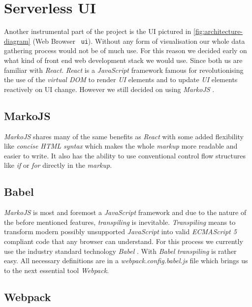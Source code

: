 \section{Serverless UI}

Another instrumental part of the project is the UI pictured in \autoref{fig:architecture-diagram}
(Web Browser \textrightarrow\ \texttt{ui}). Without any form of visualisation our whole data
gathering process would not be of much use. For this reason we decided early on what kind of front
end web development stack we would use. Since both us are familiar with \textit{React}.
\textit{React} is a \textit{JavaScript} framework famous for revolutionising the use of the
\textit{virtual DOM} to render \textit{UI} elements and to update \textit{UI} elements reactively on
UI change. However we still decided on using \textit{MarkoJS} \cite{marko}.

\subsection{MarkoJS}

\textit{MarkoJS} shares many of the same benefits as \textit{React} with some added flexibility like
\textit{concise HTML syntax} which makes the whole \textit{markup} more readable and easier to
write. It also has the ability to use conventional control flow structures like \textit{if} or
\textit{for} directly in the \textit{markup}.

\subsection{Babel}

\textit{MarkoJS} is most and foremost a \textit{JavaScript} framework and due to the nature of the
before mentioned features, \textit{transpiling} is inevitable. \textit{Transpiling} means to
transform modern possibly unsupported \textit{JavaScript} into valid \textit{ECMAScript 5} compliant
code that any browser can understand. For this process we currently use the industry standard
technology \textit{Babel} \cite{babel}. With \textit{Babel} \textit{transpiling} is rather easy. All
necessary definitions are in a \textit{webpack.config.babel.js} file which brings us to the next
essential tool \textit{Webpack}.

\subsection{Webpack}
\label{sec:webpack}


